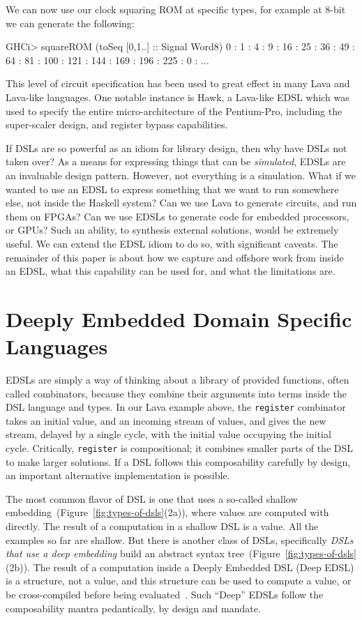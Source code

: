 \documentclass[11pt]{article}
\begin{document}
We can now use our clock squaring ROM at specific types,
for example at 8-bit we can generate the following:
\begin{Code}
GHCi> squareROM (toSeq [0,1..] :: Signal Word8)        
0 : 1 : 4 : 9 : 16 : 25 : 36 : 49 : 64 : 81 : 100 : 121 : 144 : 169 : 196 : 225 : 0 : ...
\end{Code}

This level of circuit specification has been used to great
effect in many Lava and Lava-like languages. One notable
instance is Hawk, a Lava-like EDSL which was used to specify
the entire micro-architecture of the Pentium-Pro, including the
super-scaler design, and register bypass capabilities.

If DSLs are so powerful as an idiom for library design, then why have DSLs not taken over?
As a means for expressing things that can be {\em simulated\/}, EDSLs are an invaluable
design pattern. 
However, not everything is a simulation. What if we wanted to use an EDSL to express
something that we want to run somewhere else, not inside the Haskell system?
Can we use Lava to generate circuits, and run them on FPGAs? Can we use EDSLs
to generate code for embedded processors, or GPUs? Such an ability, to 
synthesis external solutions, would be extremely useful. We can extend
the EDSL idiom to do so, with significant caveats. The remainder of this
paper is about how we capture and offshore work from inside an EDSL, what
this capability can be used for, and what the limitations are.

\section{Deeply Embedded Domain Specific Languages}

EDSLs are simply a way of thinking about a library
of provided functions, often called combinators, because they combine
their arguments into terms inside the DSL language and types. In our
Lava example above, the \verb|register| combinator takes an initial
value, and an incoming stream of values, and gives the new stream,
delayed by a single cycle, with the initial value occupying the initial
cycle. Critically, \verb|register| is compositional; it combines
smaller parts of the DSL to make larger solutions. If a DSL
follows this composability carefully by design, an important alternative implementation
is possible.

The most common flavor of DSL is one  that uses a so-called shallow embedding~(Figure~\ref{fig:types-of-dsls}(2a)), where values are computed with directly.
The result of a computation in a shallow DSL is a value. All the examples so far are shallow.
But there is another class of DSLs, 
specifically {\em DSLs that use a deep embedding\/} build an abstract syntax tree~(Figure~\ref{fig:types-of-dsls}(2b)).
The result of a computation inside a Deeply Embedded DSL (Deep EDSL)
is a structure, not a value, and this structure can be used to compute a value,
or be cross-compiled before being evaluated~\cite{Elliott:03:CompileDSEL-JFP}. Such ``Deep'' EDSLs
follow the composability mantra pedantically, by design and mandate.
\end{document}

